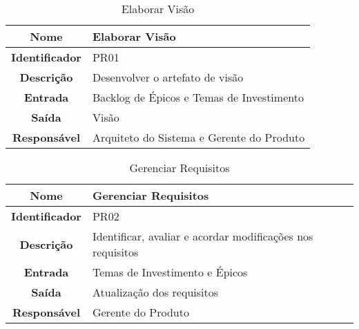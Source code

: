 {            \begin{table}[H]
                \centering
                \caption{Elaborar Visão}
                \begin{tabular}{c|p{10cm}}
                    \hline
                    \textbf{Nome}            & Elaborar Visão\\
                    \hline
                    \textbf{Identificador} & PR01\\ 
                    \hline
                    \textbf{Descrição}   & Desenvolver o artefato de visão\\ 
                    \hline
                    \textbf{Entrada}           & Backlog de Épicos e Temas de Investimento\\
                    \hline
                    \textbf{Saída}            &  Visão\\
                    \hline
                    \textbf{Responsável}            & Arquiteto do Sistema e Gerente do Produto\\
                    \hline                    
                \end{tabular}
            \end{table}

            \begin{table}[H]
                \centering
                \caption{Gerenciar Requisitos}
                \begin{tabular}{c|p{10cm}}
                    \hline
                    \textbf{Nome}            & Gerenciar Requisitos\\
                    \hline
                    \textbf{Identificador} & PR02\\ 
                    \hline
                    \textbf{Descrição}   & Identificar, avaliar e acordar modificações nos requisitos\\ 
                    \hline
                    \textbf{Entrada}           & Temas de Investimento e Épicos \\
                    \hline
                    \textbf{Saída}            &  Atualização dos requisitos\\
                    \hline
                    \textbf{Responsável}            & Gerente do Produto\\
                    \hline                    
                \end{tabular}
            \end{table}



}
